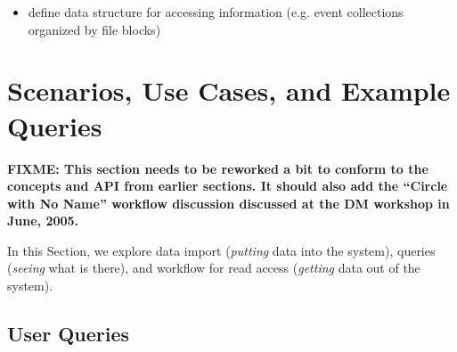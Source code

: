 \documentclass[pdftex]{cmspaper}
\begin{document}
{\begin{itemize}
\begin{itemize}
  \item Attributes associated with the production of the Event Collection, 
        including the latest processing step and the input Event 
        Collection(s). 
  \item The method searches for the best block to which to add the Event 
        Collection. The ``block'' is a special Analysis Dataset envisioned
        for this purpose. \footnote{Blocks will have attributes of
        interest to a data transfer and storage system, like maximum size
        and location information. These are of system interest only.} It
        should reconcile the processing history with existing processing
        paths and open a new Processed Dataset if necessary.
    \begin{itemize}
    \item If there is an open block, the Event Collection is added to the open 
          block.

    \item If there is no open block, a new open block is created and the Event 
          Collection is added to that one.

    \item If the new block size is greater than the maximum block size, then 
          the block is closed.  
    \end{itemize}
  \end{itemize}

\item define data structure for accessing information (e.g. event collections
      organized by file blocks)
\end{itemize}



\section{Scenarios, Use Cases, and Example Queries}

{\bf FIXME: This section needs to be reworked a bit to conform to the
concepts and API from earlier sections. It should also add the ``Circle
with No Name'' workflow discussion discussed at the DM workshop in June, 
2005.}

In this Section, we explore data import
({\em putting} data into the system), queries ({\em seeing} what is there),
and workflow for read access ({\em getting} data out of the system).

\subsection{User Queries}

}
\end{document}
